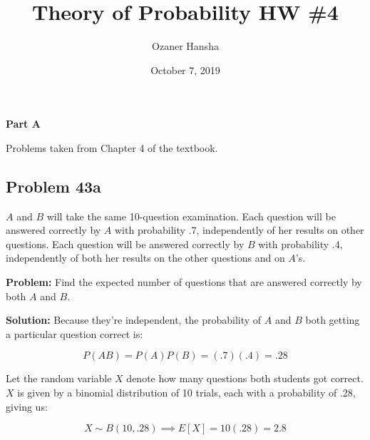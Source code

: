 \documentclass{article}
\begin{document}
\title{Theory of Probability HW \#4}
\author{Ozaner Hansha}
\date{October 7, 2019}
\maketitle

\begin{center}
    \Large{\textbf{Part A}}
\end{center}
Problems taken from Chapter 4 of the textbook.

\subsection*{Problem 43a}
$A$ and $B$ will take the same 10-question examination. Each question will be answered correctly by $A$ with probability .7, independently of her results on other questions. Each question will be answered correctly by $B$ with probability .4, independently of both her results on the other questions and on $A$'s.
\bigskip

\noindent\textbf{Problem:} Find the expected number of questions that are answered correctly by both $A$ and $B$.
\bigskip

\noindent\textbf{Solution:} Because they're independent, the probability of  $A$ and $B$ both getting a particular question correct is:

\begin{equation*}
    P(AB)=P(A)P(B)=(.7)(.4)=.28
\end{equation*}

Let the random variable $X$ denote how many questions both students got correct. $X$ is given by a binomial distribution of 10 trials, each with a probability of .28, giving us:

\begin{equation*}
    X\sim B(10,.28)\implies E[X]=10(.28)=2.8
\end{equation*}


\end{document}
